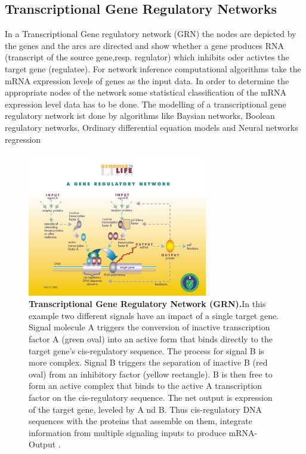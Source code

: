 \newpage
\subsection*{Transcriptional Gene Regulatory Networks}

In a Transcriptional Gene regulatory network (GRN) the nodes are depicted by the genes and the arcs are directed and show whether a gene produces RNA (transcript of the source gene,resp. regulator) which inhibits oder activtes the target gene (regulatee). For network inference computational algorithms take the mRNA expression levels of genes as the input data. In order to determine the appropriate nodes of the network some statistical classification of the mRNA expression level data has to be done. The modelling of a transcriptional gene regulatory network ist done by algorithms like Baysian networks, Boolean regulatory networks, Ordinary differential equation models and Neural networks regression %


\begin{figure}[H]
\centering
\includegraphics[width=0.7\textwidth]{./Bilder/Gene_Regulatory_Network_-_original}
\caption[Transcriptional Gene Regulatory Network (GRN)]{\textbf{Transcriptional Gene Regulatory Network (GRN).}In this example two different signals have an impact of a single target gene. Signal molecule A triggers the conversion of inactive transcription factor A (green oval) into an active form that binds directly to the target gene's cis-regulatory sequence. The process for signal B is more complex. Signal B triggers the separation of inactive B (red oval) from an inhibitory factor (yellow rectangle). B is then free to form an active complex that binds to the active A transcription factor on the cis-regulatory sequence. The net output is expression of the target gene, leveled by A nd B. Thus cis-regulatory DNA sequences with the proteins that assemble on them, integrate information from multiple signaling inputs to produce mRNA-Output . 
\citep{https://public.ornl.gov/site/gallery/detail.cfm?id=302&topic=&citation=&general=gene20regulatory20network&restsection=all} }
\label{fig:Fig.2.}
\end{figure}

